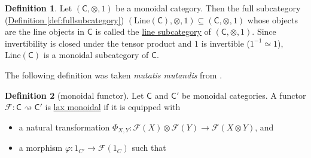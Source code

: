 \documentclass[a4paper,10pt]{scrreprt}
\newcommand{\defn}[1]{\ul{#1}}
\newcommand{\Line}{\mathrm{Line}}
\theoremstyle{definition}
\newtheorem{definition}{Definition}[section]
\theoremstyle{plain}
\theoremstyle{remark}
\begin{document}
\begin{definition}
  Let $(\mathsf{C}, \otimes, 1)$ be a monoidal category. Then the full subcategory (\hyperref[def:fullsubcategory]{Definition \ref*{def:fullsubcategory}}) $(\Line(\mathsf{C}), \otimes, 1) \subseteq (\mathsf{C}, \otimes, 1)$ whose objects are the line objects in $\mathsf{C}$ is called the \defn{line subcategory} of $(\mathsf{C}, \otimes, 1)$. Since invertibility is closed under the tensor product and $1$ is invertible ($1^{-1} \simeq 1$), $\mathrm{Line}(\mathsf{C})$ is a monoidal subcategory of $\mathsf{C}$.
\end{definition}

The following definition was taken \emph{mutatis mutandis} from \cite{baez-definitions-everyone-should-know}. 
\begin{definition}[monoidal functor]
  \label{def:monoidalfunctor}
  Let $\mathsf{C}$ and $\mathsf{C}'$ be monoidal categories. A functor $\mathcal{F}\colon \mathsf{C} \rightsquigarrow \mathsf{C}'$ is \defn{lax monoidal} if it is equipped with
  \begin{itemize}
    \item a natural transformation $\Phi_{X, Y}\colon \mathcal{F}(X) \otimes \mathcal{F}(Y) \to \mathcal{F}(X \otimes Y)$, and

    \item a morphism $\varphi\colon 1_{C'} \to \mathcal{F}(1_{C})$ such that


\end{itemize}
\end{definition}
\end{document}
